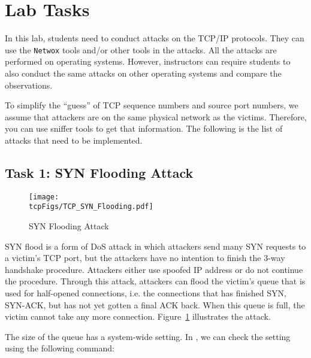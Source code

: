 \section{Lab Tasks}


In this lab, students need to conduct attacks on the TCP/IP protocols. 
They can use the {\tt Netwox} tools and/or other tools in the attacks. 
All the attacks are performed on \linux operating systems. 
However, instructors can require students to also conduct 
the same attacks on other operating systems and compare the 
observations.



To simplify the ``guess'' of TCP sequence numbers and source port numbers, 
we assume that attackers are on the same physical network as the victims. 
Therefore, you can use sniffer tools to get that information.
The following is the list of attacks that need to be implemented.



\subsection {Task 1: SYN Flooding Attack}


\begin{figure}[htb]
  \begin{center}
    \texttt{[image: \\tcpFigs/TCP\_SYN\_Flooding.pdf]}
  \end{center}
  \caption{SYN Flooding Attack}
  \label{tcp:fig:synflooding}
\end{figure}
 


SYN flood is a form of DoS attack in which attackers send many SYN
requests to a victim's TCP port, but the attackers have no intention 
to finish the 3-way handshake procedure. Attackers either use spoofed 
IP address or do not continue the procedure. 
Through this attack, attackers can flood the victim's queue that is 
used for half-opened connections, i.e. the connections that has finished SYN, SYN-ACK, 
but has not yet gotten a final ACK back. When this queue is full, 
the victim cannot take any more connection. Figure~\ref{tcp:fig:synflooding}
illustrates the attack.

The size of the queue has a system-wide setting.  In \linux, we can check the
setting using the following command: 


